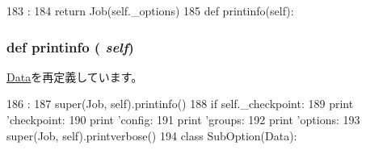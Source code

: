 \begin{DoxyCode}
183                    :
184         return Job(self._options)
185 
    def printinfo(self):
\end{DoxyCode}
\hypertarget{classm5_1_1util_1_1jobfile_1_1Job_a40bc1aa85be1c4ba18cd144234c53984}{
\subsubsection[{printinfo}]{\setlength{\rightskip}{0pt plus 5cm}def printinfo ( {\em self})}}
\label{classm5_1_1util_1_1jobfile_1_1Job_a40bc1aa85be1c4ba18cd144234c53984}


\hyperlink{classm5_1_1util_1_1jobfile_1_1Data_a40bc1aa85be1c4ba18cd144234c53984}{Data}を再定義しています。


\begin{DoxyCode}
186                        :
187         super(Job, self).printinfo()
188         if self._checkpoint:
189             print 'checkpoint: %
190         print 'config: %
191         print 'groups: %
192         print 'options: %
193         super(Job, self).printverbose()
194 
class SubOption(Data):
\end{DoxyCode}


